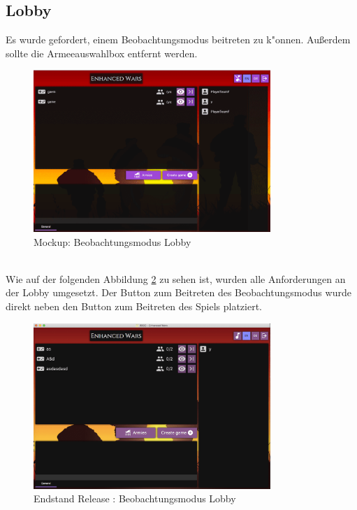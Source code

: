 \documentclass[12pt, titlepage]{scrartcl}
\newcommand{\RN}[1]{%
	\textup{\uppercase\expandafter{\romannumeral#1}}%
}
\begin{document}
		\subsection{Lobby}
			Es wurde gefordert, einem Beobachtungsmodus beitreten zu k"onnen. Au{\ss}erdem sollte die Armeeauswahlbox entfernt werden.
			\begin{figure}[H] 
				\centering
				\includegraphics[width=0.8\textwidth]{images/mockups/LobbyWatchMode.png}
				\caption{Mockup: Beobachtungsmodus Lobby}
				\label{Watch_Mode_2}
			\end{figure}
	\newpage
			\ \\ Wie auf der folgenden Abbildung \ref{End_Watch_Mode} zu sehen ist, wurden alle Anforderungen an der Lobby umgesetzt. Der Button zum Beitreten des Beobachtungsmodus wurde direkt neben den Button zum Beitreten des Spiels platziert.
			\begin{figure}[H] 
				\centering
				\includegraphics[width=0.8\textwidth]{images/endOfRelease/LobbyWatchMode.png}
				\caption{Endstand Release \RN{3}: Beobachtungsmodus Lobby}
				\label{End_Watch_Mode}
			\end{figure}
\end{document}
